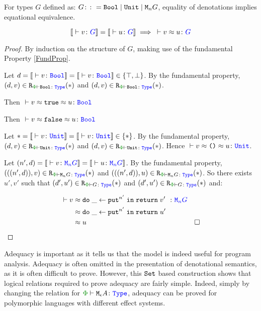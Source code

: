 \begin{framed}
    
    \begin{theorem}[Adequacy]
        For types $G$ defined as: $ G\colon\colon= \texttt{Bool} \mid \texttt{Unit} \mid \texttt{M}_{n}{G}$, equality of denotations implies equational equivalence.
        
        \begin{equation}
            \deno{\ztyperelation{v}{G}} = \deno{\ztyperelation{u}{G}} \implies \zberelation{v}{u}{G}
        \end{equation}
        
    \end{theorem}
        
        \begin{proof}
            By induction on the structure of $G$, making use of the fundamental Property \ref{FundProp}.
        

            Let $d=\deno{\ztyperelation{v}{\B}}=\deno{\ztyperelation{v}{\B}}\in \{ \top, \bot\}$. By the fundamental property, $\inLogRelPS{d}{v}{\B}$  and $\inLogRelPS{d}{v}{\B}$.
        
            Then $\zberelation{v\beequiv\t}{u}{\B}$
        
            
            Then $\zberelation{v\beequiv\f}{u}{\B}$
        

            Let $\singleton=\deno{\ztyperelation{v}{\U}}=\deno{\ztyperelation{v}{\U}}\in \{\singleton\}$. By the fundamental property, $\inLogRelPS{d}{v}{\U}$  and $\inLogRelPS{d}{v}{\U}$. Hence $\zberelation{v\beequiv\u}{u}{\U}$.
        
            \case{\teffect}
        
            Let $( n',  d) = \deno{\ztyperelation{v}{\M{n}{G}}} = \deno{\ztyperelation{u}{\M{n}{G}}}$. By the fundamental property, $\inLogRelPS{((n', d))}{v}{\M{n}{G}}$ and $\inLogRelPS{((n', d))}{u}{\M{n}{G}}$. So there exists $u', v'$ such that $\inLogRelPS{d'}{u'}{G}$ and $\inLogRelPS{d'}{u'}{G}$ and:
        
            \begin{align*}
                \zberelation{v&}{\doin{\_}{\put^{n'}}{\return{v'}}}{\M{n}{G}}\\
                &\beequiv \doin{\_}{\put^{n'}}{\return{u'}}\\
                & \beequiv u & \square
            \end{align*}
        \end{proof}
\end{framed}

Adequacy is important as it tells us that the model is indeed useful for program analysis. Adequacy is often omitted in the presentation of denotational semantics, as it is often difficult to prove. However, this $\texttt{Set}$ based construction shows that logical relations required to prove adequacy are fairly simple. Indeed, simply by changing the relation for $\wellformedt{\P}{\mea}$, adequacy can be proved for polymorphic languages with different effect systems.